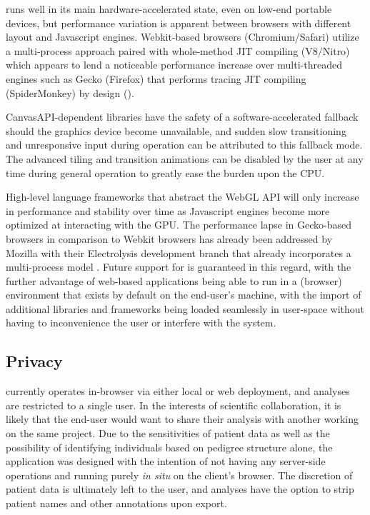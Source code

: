 \app runs well in its main hardware-accelerated state, even on low-end portable devices, but performance variation is apparent between browsers with different layout and Javascript engines. Webkit-based browsers (Chromium/Safari) utilize a multi-process approach paired with whole-method JIT compiling (V8/Nitro) which appears to lend a noticeable performance increase over multi-threaded engines such as Gecko (Firefox) that performs tracing JIT compiling (SpiderMonkey) by design (\citeauthor{v8,spidermonkey}). 

CanvasAPI-dependent libraries have the safety of a software-accelerated fallback should the graphics device become unavailable, and sudden slow transitioning and unresponsive input during \app operation can be attributed to this fallback mode. The advanced tiling and transition animations can be disabled by the user at any time during general operation to greatly ease the burden upon the CPU.

High-level language frameworks that abstract the WebGL API will only increase in performance and stability over time as Javascript engines become more optimized at interacting with the GPU. The performance lapse in Gecko-based browsers in comparison to Webkit browsers has already been addressed by Mozilla with their Electrolysis development branch that already incorporates a multi-process model \citep{firemulti}. Future support for \app is guaranteed in this regard, with the further advantage of web-based applications being able to run in a (browser) environment that exists by default on the end-user's machine, with the import of additional libraries and frameworks being loaded seamlessly in user-space without having to inconvenience the user or interfere with the system.



\subsection{Privacy}

\app currently operates in-browser via either local or web deployment, and analyses are restricted to a single user. In the interests of scientific collaboration, it is likely that the end-user would want to share their analysis with another working on the same project. Due to the sensitivities of patient data as well as the possibility of identifying individuals based on pedigree structure alone, the application was designed with the intention of not having any server-side operations and running purely \textit{in situ} on the client's browser. The discretion of patient data is ultimately left to the user, and analyses have the option to strip patient names and other annotations upon export.
